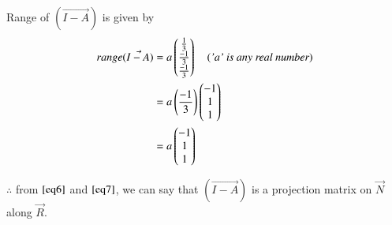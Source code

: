 \documentclass[journal,12pt,twocolumn]{IEEEtran}
\begin{document}
	Range of $(\vec{I-A})$ is given by
	\begin{align}\label{eq7}
		range(\Vec{I-A}) &= a \begin{pmatrix}\frac{1}{3}\\\frac{-1}{3}\\\frac{-1}{3}\end{pmatrix} \quad ( \textit{'a' is any real number}) \nonumber \\
		&= a \left(\frac{-1}{3}\right) \begin{pmatrix}-1\\1\\1\end{pmatrix} \nonumber\\
		&= a \begin{pmatrix}-1\\1\\1\end{pmatrix}
	\end{align}
	
	$\therefore$ from $\eqref{eq6}$ and $\eqref{eq7}$, we can say that $(\Vec{I-A})$ is a projection matrix on $\vec{N}$ along $\vec{R}$.
	
\end{document}
